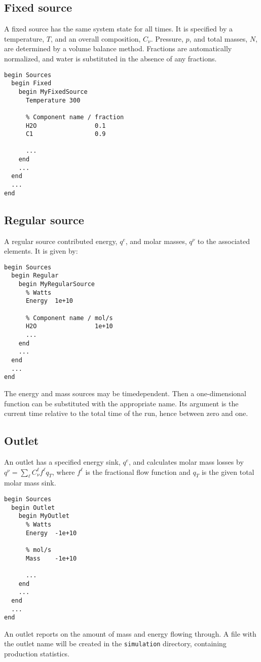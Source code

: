 \subsection{Fixed source}

A fixed source has the same system state for all times. It is
specified by a temperature, $T$, and an overall composition, $C_\nu$.
Pressure, $p$, and total masses, $N$, are determined by a volume
balance method. Fractions are automatically normalized, and water is
substituted in the absence of any fractions.

\begin{verbatim}
begin Sources
  begin Fixed
    begin MyFixedSource
      Temperature 300

      % Component name / fraction
      H2O                0.1
      C1                 0.9

      ...
    end
    ...
  end
  ...
end
\end{verbatim}


\subsection{Regular source}

A regular source contributed energy, $q^e$, and molar masses,
$q^\nu$ to the associated elements. It is given by:
\begin{verbatim}
begin Sources
  begin Regular
    begin MyRegularSource
      % Watts
      Energy  1e+10

      % Component name / mol/s
      H2O                1e+10
      ...
    end
    ...
  end
  ...
end
\end{verbatim}
The energy and mass sources may be timedependent. Then a
one-dimensional function can be substituted with the appropriate name.
Its argument is the current time relative to the total time of the
run, hence between zero and one.


\subsection{Outlet}

An outlet has a specified energy sink, $q^e$, and calculates molar
mass losses by $q^\nu=\sum_\ell C_\nu^\ell f^\ell q_T$, where $f^\ell$
is the fractional flow function and $q_T$ is the given total molar
mass sink.
\begin{verbatim}
begin Sources
  begin Outlet
    begin MyOutlet
      % Watts
      Energy  -1e+10

      % mol/s
      Mass    -1e+10

      ...
    end
    ...
  end
  ...
end
\end{verbatim}
An outlet reports on the amount of mass and energy flowing through.  A
file with the outlet name will be created in the \texttt{simulation}
directory, containing production statistics.

